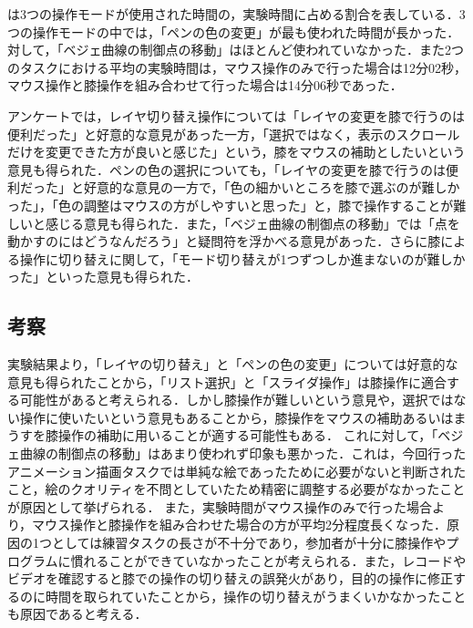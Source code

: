 \documentclass[submit, techrep]{ipsj}
\begin{document}
は3つの操作モードが使用された時間の，実験時間に占める割合を表している．3つの操作モードの中では，「ペンの色の変更」が最も使われた時間が長かった．対して，「ベジェ曲線の制御点の移動」はほとんど使われていなかった．また2つのタスクにおける平均の実験時間は，マウス操作のみで行った場合は12分02秒，マウス操作と膝操作を組み合わせて行った場合は14分06秒であった．\par
アンケートでは，レイヤ切り替え操作については「レイヤの変更を膝で行うのは便利だった」と好意的な意見があった一方，「選択ではなく，表示のスクロールだけを変更できた方が良いと感じた」という，膝をマウスの補助としたいという意見も得られた．ペンの色の選択についても，「レイヤの変更を膝で行うのは便利だった」と好意的な意見の一方で，「色の細かいところを膝で選ぶのが難しかった」，「色の調整はマウスの方がしやすいと思った」と，膝で操作することが難しいと感じる意見も得られた．また，「ベジェ曲線の制御点の移動」では「点を動かすのにはどうなんだろう」と疑問符を浮かべる意見があった．さらに膝による操作に切り替えに関して，「モード切り替えが1つずつしか進まないのが難しかった」といった意見も得られた．

\subsection{考察}
実験結果より，「レイヤの切り替え」と「ペンの色の変更」については好意的な意見も得られたことから，「リスト選択」と「スライダ操作」は膝操作に適合する可能性があると考えられる．しかし膝操作が難しいという意見や，選択ではない操作に使いたいという意見もあることから，膝操作をマウスの補助あるいはまうすを膝操作の補助に用いることが適する可能性もある．
これに対して，「ベジェ曲線の制御点の移動」はあまり使われず印象も悪かった．これは，今回行ったアニメーション描画タスクでは単純な絵であったために必要がないと判断されたこと，絵のクオリティを不問としていたため精密に調整する必要がなかったことが原因として挙げられる．
また，実験時間がマウス操作のみで行った場合より，マウス操作と膝操作を組み合わせた場合の方が平均2分程度長くなった．原因の1つとしては練習タスクの長さが不十分であり，参加者が十分に膝操作やプログラムに慣れることができていなかったことが考えられる．また，レコードやビデオを確認すると膝での操作の切り替えの誤発火があり，目的の操作に修正するのに時間を取られていたことから，操作の切り替えがうまくいかなかったことも原因であると考える．
\end{document}
